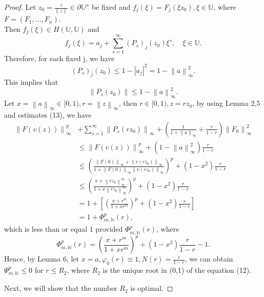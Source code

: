 \documentclass{birkjour}
\theoremstyle{plain}
\theoremstyle{definition}
\theoremstyle{definition}
\begin{document}
\begin{proof}
	Let $z_0=\frac{z}{\left \| z \right \| } \in \partial \mathbb{U} ^n$ be fixed and $f_j(\xi )=F_j(\xi z_0),\xi \in \mathbb{U} $, where $F=(F_1,\dots ,F_n)$.\\
	Then $f_j(\xi )\in H(\mathbb{U},\mathbb{U} )$ and
	\begin{equation*}
		f_j(\xi )=a_j+\sum_{s=1}^{\infty} (P_s)_j(z_0)\xi ^s, \quad \xi \in \mathbb{U}.
	\end{equation*}
	Therefore, for each fixed j, we have
	\begin{equation*}
		(P_s)_j(z_0)\le 1-\left | a_j \right | ^2=1-\left \| a \right \| ^2_{\infty}.
	\end{equation*}
	This implies that
	\begin{equation}
		\left \| P_s(z_0) \right \| \le 1-\left \| a \right \| ^2_{\infty}.
	\end{equation}
		Let $x=\left \| a \right \|_{\infty}\in [0,1), r=\left \| z \right \|_{\infty}$, then $ r \in [0,1), z=rz_0$, by using Lemma 2,5 and estimates (13), we have
	\begin{align*}
		\left \| F(v(z)) \right \|_{\infty}^p &+\sum_{s=1}^{\infty}\left \| P_s(rz_0) \right \|_{\infty}+(\frac{1}{1+\left \| a \right \|_{\infty}} +\frac{r}{1-r}  )\left \| F_0 \right \|^2_{\infty} \\
		&\le \left \| F(v(z)) \right \|_{\infty}^p+(1-\left \| a \right \|_{\infty}^2)\frac{r}{1-r}\\
		&\le (\frac{\left \| F(0) \right \|_\infty+\left \| v(rz_0) \right \|_\infty }{1+\left \| F(0) \right \|_\infty\left \| v(rz_0) \right \|_\infty})^p+(1-x^2)\frac{r}{1-r}\\
		&\le (\frac{x+\left \| rz_0 \right \|_\infty^m }{1+x\left \| rz_0 \right \|_\infty^m})^p+(1-x^2)\frac{r}{1-r}\\
		&=1+[(\frac{x+r^m }{1+xr^m})^p+(1-x^2)\frac{r}{1-r}]\\
		&=1+\Phi _{m,\mathbb{N}}^p(r),
	\end{align*}
	which is less than or equal 1 provided $\Phi _{m,\mathbb{N}}^p(r)$, where
	\begin{equation}
	\Phi _{m,\mathbb{N}}^p(r)=(\frac{x+r^m }{1+xr^m})^p+(1-x^2)\frac{r}{1-r}-1.
	\end{equation}
	Hence, by Lemma 6, let $x=a, \varphi _0(r)\equiv 1, N(r)=\frac{r}{1-r} $, we can obtain $\Psi _{m,\mathbb{N}}^p \le 0$ for $r \le R_2$, where $R_2$ is the unique root in (0,1) of the equation (12).
	\par
	Next, we will show that the number $R_2$ is optimal.

\end{proof}
\end{document}
